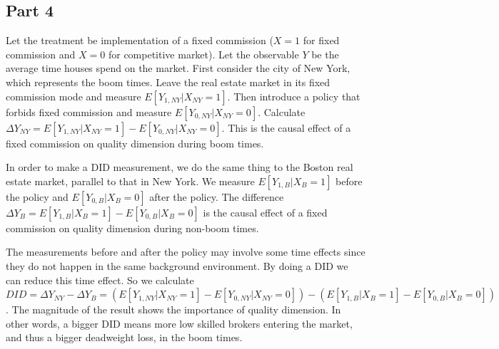 \documentclass{article}
\begin{document}
\subsection{Part 4}
Let the treatment be implementation of a fixed commission ($X=1$ for fixed commission and $X=0$ for competitive market). Let the observable $Y$ be the average time houses spend on the market. First consider the city of New York, which represents the boom times. Leave the real estate market in its fixed commission mode and measure $E[Y_{1,NY}|X_{NY}=1]$. Then introduce a policy that forbids fixed commission and measure $E[Y_{0,NY}|X_{NY}=0]$. Calculate $\Delta Y_{NY}=E[Y_{1,NY}|X_{NY}=1]-E[Y_{0,NY}|X_{NY}=0]$. This is the causal effect of a fixed commission on quality dimension during boom times.

In order to make a DID measurement, we do the same thing to the Boston real estate market, parallel to that in New York. We measure $E[Y_{1,B}|X_B=1]$ before the policy and $E[Y_{0,B}|X_B=0]$ after the policy. The difference $\Delta Y_B=E[Y_{1,B}|X_B=1]-E[Y_{0,B}|X_B=0]$ is the causal effect of a fixed commission on quality dimension during non-boom times.

The measurements before and after the policy may involve some time effects since they do not happen in the same background environment. By doing a DID we can reduce this time effect. So we calculate $DID=\Delta Y_{NY}-\Delta Y_B=(E[Y_{1,NY}|X_{NY}=1]-E[Y_{0,NY}|X_{NY}=0])-(E[Y_{1,B}|X_B=1]-E[Y_{0,B}|X_B=0])$. The magnitude of the result shows the importance of quality dimension. In other words, a bigger DID means more low skilled brokers entering the market, and thus a bigger deadweight loss, in the boom times.
\end{document}
